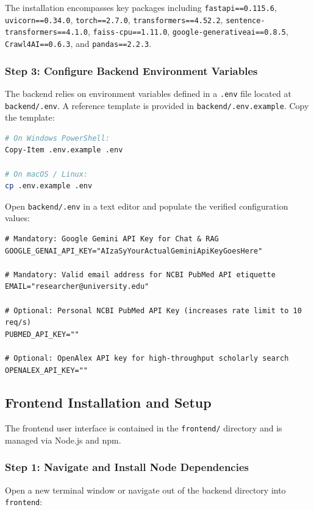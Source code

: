 \noindent The installation encompasses key packages including \texttt{fastapi==0.115.6}, \texttt{uvicorn==0.34.0}, \texttt{torch==2.7.0}, \texttt{transformers==4.52.2}, \texttt{sentence-transformers==4.1.0}, \texttt{faiss-cpu==1.11.0}, \texttt{google-generativeai==0.8.5}, \texttt{Crawl4AI==0.6.3}, and \texttt{pandas==2.2.3}.

\subsubsection{Step 3: Configure Backend Environment Variables}
The backend relies on environment variables defined in a \texttt{.env} file located at \texttt{backend/.env}. A reference template is provided in \texttt{backend/.env.example}. Copy the template:

\begin{lstlisting}[language=bash, caption={Initializing Environment Configuration}]
# On Windows PowerShell:
Copy-Item .env.example .env

# On macOS / Linux:
cp .env.example .env
\end{lstlisting}

Open \texttt{backend/.env} in a text editor and populate the verified configuration values:

\begin{lstlisting}[caption={Example backend/.env Configuration File}]
# Mandatory: Google Gemini API Key for Chat & RAG
GOOGLE_GENAI_API_KEY="AIzaSyYourActualGeminiApiKeyGoesHere"

# Mandatory: Valid email address for NCBI PubMed API etiquette
EMAIL="researcher@university.edu"

# Optional: Personal NCBI PubMed API Key (increases rate limit to 10 req/s)
PUBMED_API_KEY=""

# Optional: OpenAlex API key for high-throughput scholarly search
OPENALEX_API_KEY=""
\end{lstlisting}

\subsection{Frontend Installation and Setup}
The frontend user interface is contained in the \texttt{frontend/} directory and is managed via Node.js and npm.

\subsubsection{Step 1: Navigate and Install Node Dependencies}
Open a new terminal window or navigate out of the backend directory into \texttt{frontend}:

